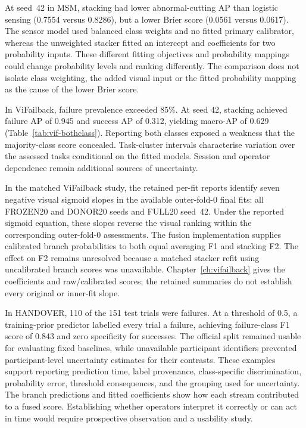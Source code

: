 At seed~42 in MSM, stacking had lower abnormal-cutting AP than logistic sensing
(0.7554 versus 0.8286), but a lower Brier score (0.0561 versus 0.0617). The sensor model
used balanced class weights and no fitted primary calibrator, whereas the unweighted
stacker fitted an intercept and coefficients for two probability inputs. These different
fitting objectives and probability mappings could change probability levels and ranking
differently. The comparison does not isolate class weighting, the added visual input or
the fitted probability mapping as the cause of the lower Brier score.

In ViFailback, failure prevalence exceeded 85\%. At seed 42, stacking achieved failure AP of 0.945 and
success AP of 0.312, yielding macro-AP of 0.629 (Table~\ref{tab:vif-bothclass}). Reporting
both classes exposed a weakness that the majority-class score concealed. Task-cluster
intervals characterise variation over the assessed tasks conditional on the fitted
models. Session and operator dependence remain additional sources of uncertainty.

In the matched ViFailback study, the retained per-fit reports identify seven negative
visual sigmoid slopes in the available outer-fold-0 final fits: all FROZEN20 and DONOR20
seeds and FULL20 seed~42. Under the reported sigmoid equation, these slopes reverse the
visual ranking within the corresponding outer-fold-0 assessments. The fusion implementation supplies calibrated branch probabilities to both equal averaging F1 and
stacking F2. The effect on F2 remains unresolved because a matched stacker refit using
uncalibrated branch scores was unavailable. Chapter~\ref{ch:vifailback} gives the
coefficients and raw/calibrated scores; the retained summaries do not establish every
original or inner-fit slope.
{}

In HANDOVER, 110 of the 151 test trials were failures. At a threshold of 0.5, a
training-prior predictor labelled every trial a failure, achieving failure-class F1 score of 0.843
and zero specificity for successes. The official split remained usable for evaluating
fixed baselines, while unavailable participant identifiers prevented participant-level
uncertainty estimates for their contrasts. These examples support reporting prediction
time, label provenance, class-specific discrimination, probability error, threshold
consequences, and the grouping used for uncertainty. The branch predictions and fitted
coefficients show how each stream contributed to a fused score. Establishing whether
operators interpret it correctly or can act in time would require prospective
observation and a usability study.


